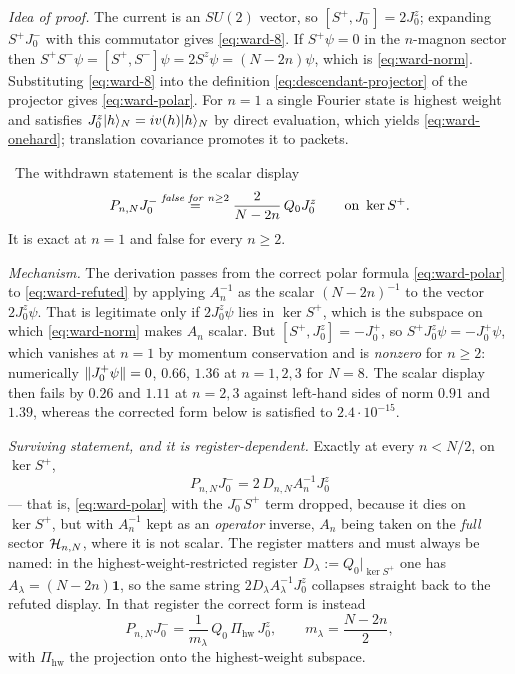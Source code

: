\emph{Idea of proof.} The current is an $SU(2)$ vector, so
$[S^+,J^-_0]=2J^z_0$; expanding $S^+J^-_0$ with this commutator gives
\cref{eq:ward-8}. If $S^+\psi=0$ in the $n$-magnon sector then
$S^+S^-\psi=[S^+,S^-]\psi=2S^z\psi=(N-2n)\psi$, which is
\cref{eq:ward-norm}. Substituting \cref{eq:ward-8} into the definition
\cref{eq:descendant-projector} of the projector gives \cref{eq:ward-polar}.
For $n=1$ a single Fourier state is highest weight and satisfies
$J^z_0|h\rangle_N=iv(h)|h\rangle_N$ by direct evaluation, which yields
\cref{eq:ward-onehard}; translation covariance promotes it to packets.

\begin{refutedclaim}
\label{ref:ward-scalar}
\statusRefuted\ The withdrawn statement is the scalar display
\begin{equation}
  P_{n,N}J^-_0
  \overset{\text{\emph{false for }} n\ge2}{=}
  \frac{2}{N-2n}\,Q_0J^z_0
  \qquad\text{on }\ker S^+ .
  \label{eq:ward-refuted}
\end{equation}
It is exact at $n=1$ and false for every $n\ge2$.

\emph{Mechanism.} The derivation passes from the correct polar formula
\cref{eq:ward-polar} to \cref{eq:ward-refuted} by applying $A_n^{-1}$ as the
scalar $(N-2n)^{-1}$ to the vector $2J^z_0\psi$. That is legitimate only if
$2J^z_0\psi$ lies in $\ker S^+$, which is the subspace on which
\cref{eq:ward-norm} makes $A_n$ scalar. But $[S^+,J^z_0]=-J^+_0$, so
$S^+J^z_0\psi=-J^+_0\psi$, which vanishes at $n=1$ by momentum conservation
and is \emph{nonzero} for $n\ge2$: numerically $\lVert J^+_0\psi\rVert=0$, $0.66$,
$1.36$ at $n=1,2,3$ for $N=8$. The scalar display then fails by
$0.26$ and $1.11$ at $n=2,3$ against left-hand sides of norm $0.91$ and
$1.39$, whereas the corrected form below is satisfied to $2.4\cdot10^{-15}$.

\emph{Surviving statement, and it is register-dependent.} Exactly at every
$n<N/2$, on $\ker S^+$,
\begin{equation}
  \boxed{\;P_{n,N}J^-_0=2\,D_{n,N}A_n^{-1}J^z_0\;}
  \label{eq:ward-corrected}
\end{equation}
--- that is, \cref{eq:ward-polar} with the $J^-_0S^+$ term dropped, because it
dies on $\ker S^+$, but with $A_n^{-1}$ kept as an \emph{operator} inverse,
$A_n$ being taken on the \emph{full} sector $\mathcal{H}_{n,N}$, where it is not
scalar. The register matters and must always be named: in the
highest-weight-restricted register $D_\lambda:=Q_0|_{\ker S^+}$ one has
$A_\lambda=(N-2n)\mathbf 1$, so the same string $2D_\lambda A_\lambda^{-1}J^z_0$
collapses straight back to the refuted display. In that register the correct
form is instead
\begin{equation}
  P_{n,N}J^-_0=\frac{1}{m_\lambda}\,Q_0\,\Pi_{\mathrm{hw}}\,J^z_0,
  \qquad m_\lambda=\frac{N-2n}{2},
\end{equation}
with $\Pi_{\mathrm{hw}}$ the projection onto the highest-weight subspace.


\end{refutedclaim}
